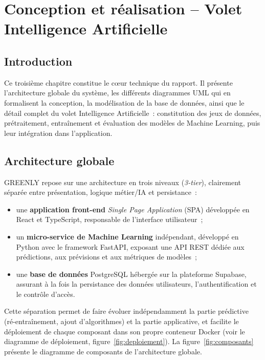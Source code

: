 \chapter{Conception et réalisation -- Volet Intelligence Artificielle}

\section*{Introduction}
Ce troisième chapitre constitue le cœur technique du rapport. Il présente l'architecture globale du système, les différents diagrammes UML qui en formalisent la conception, la modélisation de la base de données, ainsi que le détail complet du volet Intelligence Artificielle~: constitution des jeux de données, prétraitement, entraînement et évaluation des modèles de Machine Learning, puis leur intégration dans l'application.

\section{Architecture globale}

GREENLY repose sur une architecture en trois niveaux (\textit{3-tier}), clairement séparée entre présentation, logique métier/IA et persistance~:

\begin{itemize}[label=\textbullet,font=\normalsize]
    \item une \textbf{application front-end} \textit{Single Page Application} (SPA) développée en React et TypeScript, responsable de l'interface utilisateur~;
    \item un \textbf{micro-service de Machine Learning} indépendant, développé en Python avec le framework FastAPI, exposant une API REST dédiée aux prédictions, aux prévisions et aux métriques de modèles~;
    \item une \textbf{base de données} PostgreSQL hébergée sur la plateforme Supabase, assurant à la fois la persistance des données utilisateurs, l'authentification et le contrôle d'accès.
\end{itemize}

Cette séparation permet de faire évoluer indépendamment la partie prédictive (ré-entraînement, ajout d'algorithmes) et la partie applicative, et facilite le déploiement de chaque composant dans son propre conteneur Docker (voir le diagramme de déploiement, figure~\ref{fig:deploiement}). La figure~\ref{fig:composants} présente le diagramme de composants de l'architecture globale.

